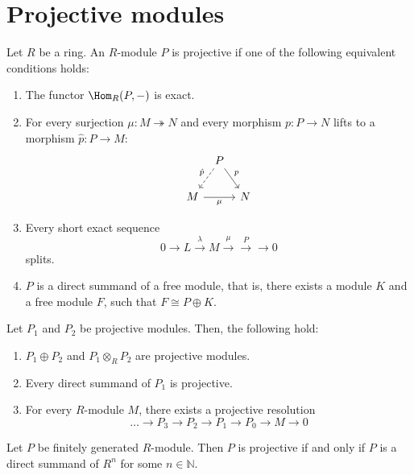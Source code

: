 \section{Projective modules}

\begin{definition}
  Let $R$ be a ring.
  An $R$-module $P$ is projective if one of the following equivalent
  conditions holds:
   \begin{enumerate}[p]
    \item The functor $\Hom_R(P, \dash)$ is exact.
    \item For every surjection $\mu \colon  M \twoheadrightarrow N$
      and every morphism $p\colon P \to N$ lifts to a morphism
      $\hat{p} \colon  P \to  M$:
      \[
      \begin{tikzcd}[column sep = tiny]
      & P \ar[swap,dashed]{dl}{\hat{p}} \ar{dr}{p} \\
      M \ar[swap]{rr}{\mu} & & N
      \end{tikzcd}
      \]
    \item Every short exact sequence
      \[
      0 \to  L \xrightarrow{λ} M \xrightarrow{\mu} \xrightarrow{P} \to 0
      \] 
      splits.
    \item $P$ is a direct summand of a free module,
      that is, there exists a module $K$ and a free module  $F$,
      such that  $F \cong P \oplus K$.
  \end{enumerate}
\end{definition}

\begin{lemma}
  \label{lm:facts-projective-modules}
  Let $P_1$ and $P_2$ be projective modules.
  Then, the following hold:
  \begin{enumerate}[h]
    \item
      $P_1 \oplus P_2$ and $P_1 \otimes _R P_2$
      are projective modules.
    \item Every direct summand of $P_1$ is projective.
    \item For every $R$-module  $M$, there exists a projective resolution
       \[
      \ldots \to P_3 \to P_2 \to P_1 \to P_0 \to  M \to  0
      \] 
  \end{enumerate}
\end{lemma}

\begin{lemma}
  Let $P$ be finitely generated $R$-module.
  Then  $P$ is projective if and only if  $P$ is a direct summand
  of  $R^n$ for some $n\in \mathbb{N}$.
\end{lemma}

